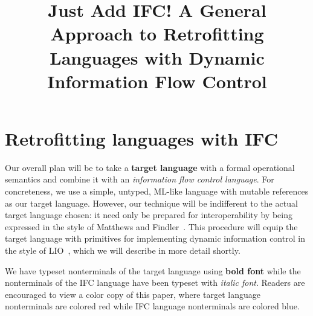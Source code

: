 \documentclass{sigplanconf}
\begin{document}





\title{
Just Add IFC! A General Approach to Retrofitting Languages with Dynamic Information Flow Control
}


\maketitle




\section{Retrofitting languages with IFC}
\label{sec:retrofit}

Our overall plan will be to take a \textbf{{\color{red} target language}} with a formal
operational semantics and combine it with an \textit{{\color{blue} information
flow control language}}.  For concreteness, we use a simple, untyped,
ML-like language with mutable references as our target language.
However, our technique will be indifferent to the actual target language
chosen: it need only be prepared for interoperability by being expressed
in the style of Matthews and
Findler~\cite{Matthews:2007:OSM:1190216.1190220}.  This procedure will
equip the target language with primitives for implementing dynamic
information control in the style of LIO~\cite{lio}, which we will
describe in more detail shortly.

We have typeset nonterminals of the target language using \textbf{{\color{red}
bold font}} while the nonterminals of the IFC language have been typeset
with \textit{{\color{blue} italic font}}.  Readers are encouraged to view
a color copy of this paper, where target language nonterminals are colored red
while IFC language nonterminals are colored blue.
\end{document}
